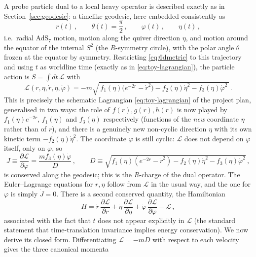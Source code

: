 \documentclass[11pt]{article}
\begin{document}
A probe particle dual to a local heavy operator is described exactly as in Section~\ref{sec:geodesic}: a timelike geodesic, here embedded consistently as
\begin{equation}
r(t)\,,\qquad \theta(t)=\frac\pi2\,,\qquad \varphi(t)\,,\qquad \eta(t)\,,
\end{equation}
i.e.\ radial AdS$_7$ motion, motion along the quiver direction $\eta$, and motion around the equator of the internal $S^2$ (the $R$-symmetry circle), with the polar angle $\theta$ frozen at the equator by symmetry. Restricting \eqref{eq:6dmetric} to this trajectory and using $t$ as worldline time (exactly as in \eqref{eq:toy-lagrangian}), the particle action is $S=\int dt\,\mathcal L$ with
\begin{equation}
\mathcal L(r,\eta,\dot r,\dot\eta,\dot\varphi)
=
-m\sqrt{\,f_1(\eta)\big(e^{-2r}-\dot r^2\big)-f_2(\eta)\dot\eta^2-f_3(\eta)\dot\varphi^2\,}\,.
\label{eq:6dLagrangian}
\end{equation}
This is precisely the schematic Lagrangian \eqref{eq:toy-lagrangian} of the project plan, generalised in two ways: the role of $f(r),g(r),h(r)$ is now played by $f_1(\eta)e^{-2r}$, $f_1(\eta)$ and $f_3(\eta)$ respectively (functions of the \emph{new} coordinate $\eta$ rather than of $r$), and there is a genuinely new non-cyclic direction $\eta$ with its own kinetic term $-f_2(\eta)\dot\eta^2$. The coordinate $\varphi$ is still cyclic: $\mathcal L$ does not depend on $\varphi$ itself, only on $\dot\varphi$, so
\begin{equation}
J\equiv\frac{\partial\mathcal L}{\partial\dot\varphi}=\frac{mf_3(\eta)\dot\varphi}{D}\,,
\qquad
D\equiv\sqrt{f_1(\eta)(e^{-2r}-\dot r^2)-f_2(\eta)\dot\eta^2-f_3(\eta)\dot\varphi^2}\,,
\label{eq:6dJdef}
\end{equation}
is conserved along the geodesic; this is the $R$-charge of the dual operator. The Euler--Lagrange equations for $r,\eta$ follow from $\mathcal L$ in the usual way, and the one for $\varphi$ is simply $\dot J=0$. There is a second conserved quantity, the Hamiltonian
\begin{equation}
H=\dot r\,\frac{\partial\mathcal L}{\partial\dot r}+\dot\eta\,\frac{\partial\mathcal L}{\partial\dot\eta}+\dot\varphi\,\frac{\partial\mathcal L}{\partial\dot\varphi}-\mathcal L\,,
\end{equation}
associated with the fact that $t$ does not appear explicitly in $\mathcal L$ (the standard statement that time-translation invariance implies energy conservation). We now derive its closed form. Differentiating $\mathcal L=-mD$ with respect to each velocity gives the three canonical momenta
\end{document}
